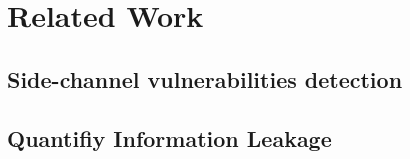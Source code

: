 \section{Related Work}
\subsection{Side-channel vulnerabilities detection}
\subsection{Quantifiy Information Leakage}